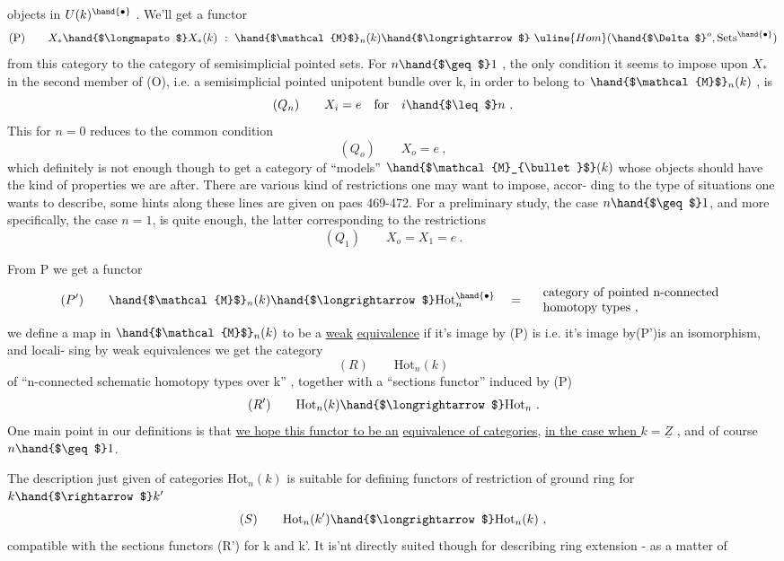 
objects in $U(k)^\hand{\bullet}$ . We'll get a functor
\[ \text{(P)}\qquad X_{*}\hand{$\longmapsto$}X_{*}(k) \ : \ \hand{$\mathcal{M}$}_{n}(k)\hand{$\longrightarrow$} \ \uline{Hom}(\hand{$\Delta$}^{o},\mathrm{Sets}^{\hand{\bullet}}) \]
from this category to the category of semisimplicial pointed sets. 
For $n\hand{$\geq$}1$ , the only condition it seems to impose upon $X_{*}$ in the
second member of (O), i.e.  a semisimplicial pointed unipotent bundle over
k, in order to belong to $\hand{$\mathcal{M}$}_{n}(k)$ , is
\[ (Q_{n})\qquad X_{i} = e \quad\text{for}\quad i \hand{$\leq$} n \ . \]
This for $n=0$ reduces to the common condition
\[ (Q_{o})\qquad X_{o} = e \ , \]
which definitely is not enough though to get a category of ``models''
$\hand{$\mathcal{M}_{\bullet}$}(k)$ whose objects should have the kind of properties we are after.
There are various kind of  restrictions one may want to impose, accor-%
ding to the type of situations one wants to describe, some hints along
these lines are given on paes 469-472. For a preliminary study, the
case $n\hand{$\geq$} 1$, and more specifically, the case $n=1$, is quite enough, the
latter corresponding to the restrictions
\[ (Q_{1})\qquad X_{o} = X_{1} = e \ . \]

From P we get a functor
\[ (P')\qquad \hand{$\mathcal{M}$}_{n}(k) \hand{$\longrightarrow$} \mathrm{Hot}^{\hand{\bullet}}_{n} \quad = \quad \begin{array}{l}\text{category of pointed n-connected}\\ \text{homotopy types ,}\end{array} \]
we define  a map in $\hand{$\mathcal{M}$}_{n}(k)$ to be a \uline{weak} \uline{equivalence} if it's
image by (P) is i.e. it's image by(P')is an isomorphism, and locali-%
sing by weak equivalences we get the category
\[ (R)\qquad \mathrm{Hot}_{n}(k) \]
of ``n-connected schematic homotopy types over k'' , together with a
``sections functor'' induced by (P)
\[ (R')\qquad \mathrm{Hot}_{n}(k) \hand{$\longrightarrow$} \mathrm{Hot}_{n} \ . \]
One main point in our definitions is that \uline{we hope this functor to be an}
\uline{equivalence of categories}, \uline{in the case when $k=\underline{Z}$} , and of course $n\hand{$\geq$} 1$.

The description just given of categories $\mathrm{Hot}_{n}(k)$ is suitable for
defining functors of restriction of ground ring for $k \hand{$\rightarrow$} k'$
\[ (S)\qquad \mathrm{Hot}_{n}(k')\hand{$\longrightarrow$} \mathrm{Hot}_{n}(k) \ , \]
compatible with the sections functors (R') for k and k'. It is'nt
directly suited though for describing ring extension - as a matter of


